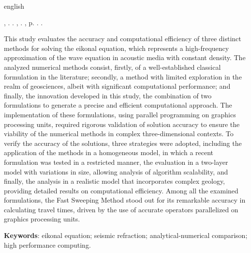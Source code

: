 \begin{resumo}[Abstract]
    \begin{otherlanguage*}{english}

	\begin{flushleft}
	\MakeUppercase{\imprimirSobrenome}, \imprimirPrimeirosNomes. \textbf{\imprimirTituloEmIngles}. \imprimirtipotrabalhoIngles, \imprimirinstituicaoIngles. \imprimirlocal,  p. \pageref{LastPage}. \imprimirAnoDeDefesa.
	\end{flushleft}

    \fonteResumo
	This study evaluates the accuracy and computational efficiency of three distinct methods for solving the eikonal equation, which represents a high-frequency approximation of the wave equation in acoustic media with constant density. The analyzed numerical methods consist, firstly, of a well-established classical formulation in the literature; secondly, a method with limited exploration in the realm of geosciences, albeit with significant computational performance; and finally, the innovation developed in this study, the combination of two formulations to generate a precise and efficient computational approach. The implementation of these formulations, using parallel programming on graphics processing units, required rigorous validation of solution accuracy to ensure the viability of the numerical methods in complex three-dimensional contexts. To verify the accuracy of the solutions, three strategies were adopted, including the application of the methods in a homogeneous model, in which a recent formulation was tested in a restricted manner, the evaluation in a two-layer model with variations in size, allowing analysis of algorithm scalability, and finally, the analysis in a realistic model that incorporates complex geology, providing detailed results on computational efficiency. Among all the examined formulations, the Fast Sweeping Method stood out for its remarkable accuracy in calculating travel times, driven by the use of accurate operators parallelized on graphics processing units.
    
    \vspace{\onelineskip}
     
    \noindent 
    \textbf{Keywords}: eikonal equation; seismic refraction; analytical-numerical comparison; high performance computing.
    
    \end{otherlanguage*}
\end{resumo}
